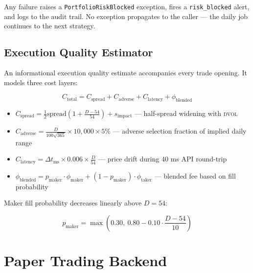 \documentclass[12pt, a4paper]{article}
\theoremstyle{definition}
\newcommand{\DVOL}{\textsc{dvol}}
\begin{document}
Any failure raises a \texttt{PortfolioRiskBlocked} exception, fires a
\texttt{risk\_blocked} alert, and logs to the audit trail. No exception
propagates to the caller — the daily job continues to the next strategy.

\subsection{Execution Quality Estimator}

An informational execution quality estimate accompanies every trade opening.
It models three cost layers:

\begin{equation}
    C_{\text{total}} = C_{\text{spread}} + C_{\text{adverse}} + C_{\text{latency}} + \phi_{\text{blended}}
    \label{eq:total_cost}
\end{equation}

\begin{itemize}[leftmargin=2em]
    \item $C_{\text{spread}} = \tfrac{1}{2}\text{spread}(1 + \tfrac{D - 54}{54}) + s_{\text{impact}}$
          — half-spread widening with \DVOL{}
    \item $C_{\text{adverse}} = \frac{D}{100\sqrt{365}} \times 10{,}000 \times 5\%$
          — adverse selection fraction of implied daily range
    \item $C_{\text{latency}} = \Delta t_{\text{ms}} \times 0.006 \times \tfrac{D}{54}$
          — price drift during 40 ms API round-trip
    \item $\phi_{\text{blended}} = p_{\text{maker}} \cdot \phi_{\text{maker}} + (1 - p_{\text{maker}}) \cdot \phi_{\text{taker}}$
          — blended fee based on fill probability
\end{itemize}

Maker fill probability decreases linearly above $D = 54$:

\begin{equation}
    p_{\text{maker}} = \max\!\left(0.30,\ 0.80 - 0.10 \cdot \frac{D - 54}{10}\right)
\end{equation}

\section{Paper Trading Backend}
\end{document}
